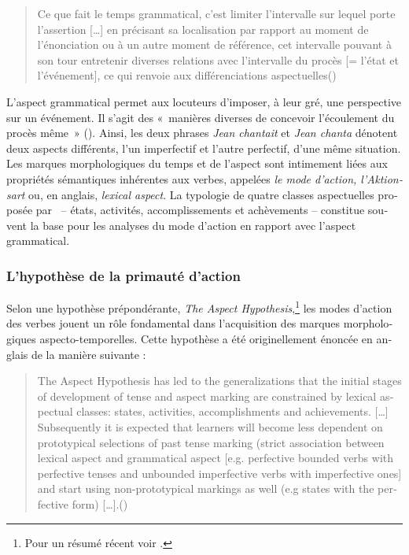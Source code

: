 \documentclass[french, output=paper]{langscibook}
\begin{document}
\begin{otherlanguage}{french}
\begin{quote}
Ce que fait le temps grammatical, c’est limiter l’intervalle sur lequel porte l’assertion […] en précisant sa localisation par rapport au moment de l’énonciation ou à un autre moment de référence, cet intervalle pouvant à son tour entretenir diverses relations avec l’intervalle du procès [= l’état et l’événement], ce qui renvoie aux différenciations aspectuelles\hbox{}\hfill\hbox{(\citealt[227]{Noyau1997})}
\end{quote}


L’aspect grammatical permet aux locuteurs d’imposer, à leur gré, une perspective sur un événement. Il s’agit des «~manières diverses de concevoir l’écoulement du procès même~» (\citealt[6]{Holt1943}). Ainsi, les deux phrases \textit{Jean chantait} et \textit{Jean chanta} dénotent deux aspects différents, l’un imperfectif et l’autre perfectif, d’une même situation. Les marques morphologiques du temps et de l’aspect sont intimement liées aux propriétés sémantiques inhérentes aux verbes, appelées \textit{le mode d’action, l’Aktionsart} ou, en anglais, \textit{lexical aspect}. La typologie de quatre classes aspectuelles proposée par \citet{Vendler1957}~-- états, activités, accomplissements et achèvements -- constitue souvent la base pour les analyses du mode d’action en rapport avec l’aspect grammatical.


\subsubsection{L’hypothèse de la primauté d’action}\label{sec:kihlstedt:1.1.1}

Selon une hypothèse prépondérante, \textit{The Aspect Hypothesis},\footnote{Pour un résumé récent voir \citet{Bardovi-HarligComajoan-Colomé2020}.} les modes d’action des verbes jouent un rôle fondamental dans l’acquisition des marques morphologiques aspecto-temporelles. Cette hypothèse a été originellement énoncée en anglais de la manière suivante :


\begin{quote}
The Aspect Hypothesis has led to the generalizations that the initial stages of development of tense and aspect marking are constrained by lexical aspectual classes: states, activities, accomplishments and achievements. […] Subsequently it is expected that learners will become less dependent on prototypical selections of past tense marking (strict association between lexical aspect and grammatical aspect [e.g. perfective bounded verbs with perfective tenses and unbounded imperfective verbs with imperfective ones] and start using non-prototypical markings as well (e.g states with the perfective form) […].\hbox{}\hfill\hbox{(\citealt[556]{AyounSalaberry2008})}
\end{quote}



\end{otherlanguage}
\end{document}
